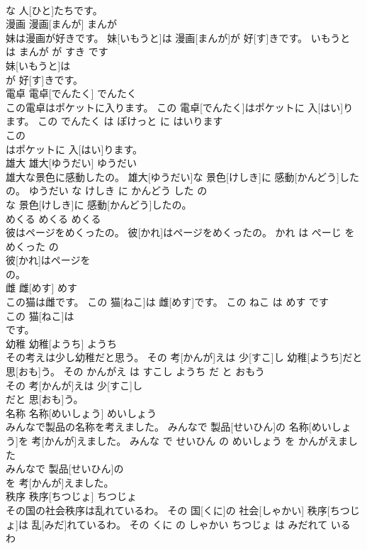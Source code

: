 \documentclass[8pt]{extreport}
\begin{document}
\begin{CJK}{UTF8}{min}
\\	な 人[ひと]たちです。			
\\	漫画	漫画[まんが]	まんが	
\\	妹は漫画が好きです。	妹[いもうと]は 漫画[まんが]が 好[す]きです。	いもうと は まんが が すき です	
\\	妹[いもうと]は
\\	が 好[す]きです。			
\\	電卓	電卓[でんたく]	でんたく	
\\	この電卓はポケットに入ります。	この 電卓[でんたく]はポケットに 入[はい]ります。	この でんたく は ぽけっと に はいります	
\\	この
\\	はポケットに 入[はい]ります。			
\\	雄大	雄大[ゆうだい]	ゆうだい	
\\	雄大な景色に感動したの。	雄大[ゆうだい]な 景色[けしき]に 感動[かんどう]したの。	ゆうだい な けしき に かんどう した の	
\\	な 景色[けしき]に 感動[かんどう]したの。			
\\	めくる	めくる	めくる	
\\	彼はページをめくったの。	彼[かれ]はページをめくったの。	かれ は ぺーじ を めくった の	
\\	彼[かれ]はページを
\\	の。			
\\	雌	雌[めす]	めす	
\\	この猫は雌です。	この 猫[ねこ]は 雌[めす]です。	この ねこ は めす です	
\\	この 猫[ねこ]は
\\	です。			
\\	幼稚	幼稚[ようち]	ようち	
\\	その考えは少し幼稚だと思う。	その 考[かんが]えは 少[すこ]し 幼稚[ようち]だと 思[おも]う。	その かんがえ は すこし ようち だ と おもう	
\\	その 考[かんが]えは 少[すこ]し
\\	だと 思[おも]う。			
\\	名称	名称[めいしょう]	めいしょう	
\\	みんなで製品の名称を考えました。	みんなで 製品[せいひん]の 名称[めいしょう]を 考[かんが]えました。	みんな で せいひん の めいしょう を かんがえました	
\\	みんなで 製品[せいひん]の
\\	を 考[かんが]えました。			
\\	秩序	秩序[ちつじょ]	ちつじょ	
\\	その国の社会秩序は乱れているわ。	その 国[くに]の 社会[しゃかい] 秩序[ちつじょ]は 乱[みだ]れているわ。	その くに の しゃかい ちつじょ は みだれて いる わ	

\end{CJK}
\end{document}
